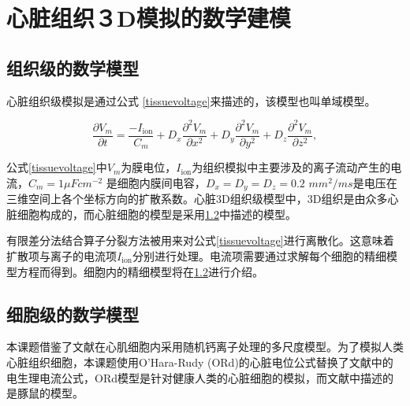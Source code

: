 

\section{心脏组织３D模拟的数学建模}

\subsection{组织级的数学模型}
心脏组织级模拟是通过公式 \ref{tissuevoltage}来描述的，该模型也叫单域模型。

\begin{equation}
\frac{\partial V_{m}}{\partial t}=\frac{-I_\mathrm{ion}}{C_{m}} + D_{x}\frac{\partial^{2}V_{m}}{\partial x^{2}}+D_{y}\frac{\partial^{2}V_{m}}{\partial  y^{2}}+D_{z}\frac{\partial^{2}V_{m}}{\partial z^{2}},
\label{tissuevoltage}
\end{equation}

公式\ref{tissuevoltage}中$V_{m}$为膜电位，$I_\mathrm{ion}$为组织模拟中主要涉及的离子流动产生的电流，$C_{m}=1\mu F cm^{-2}$ 是细胞内膜间电容，$D_{x}=D_y=D_z=0.2 $ $mm^{2}/ms$是电压在三维空间上各个坐标方向的扩散系数。心脏3D组织级模型中，3D组织是由众多心脏细胞构成的，而心脏细胞的模型是采用\ref{cellmodel}中描述的模型。

有限差分法结合算子分裂方法被用来对公式\ref{tissuevoltage}进行离散化。这意味着扩散项与离子的电流项$I_\mathrm{ion}$分别进行处理。电流项需要通过求解每个细胞的精细模型方程而得到。细胞内的精细模型将在\ref{cellmodel}进行介绍。

\subsection{细胞级的数学模型}
\label{cellmodel}

 本课题借鉴了文献在心肌细胞内采用随机钙离子处理的多尺度模型。为了模拟人类心脏组织细胞，本课题使用O'Hara-Rudy (ORd)的心脏电位公式替换了文献中的电生理电流公式，ORd模型是针对健康人类的心脏细胞的模拟，而文献中描述的是豚鼠的模型。
 
